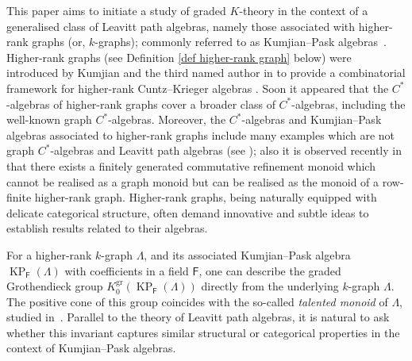 \documentclass[12pt]{amsart}
\newcommand{\KP}{\operatorname{KP}}
\theoremstyle{definition}
\theoremstyle{remark}
\newcommand{\gr}{\operatorname{gr}}
\begin{document}
This paper aims to initiate a study of graded $K$-theory in the context of a generalised class of Leavitt path algebras, namely those associated with higher-rank graphs (or, $k$-graphs); commonly referred to as Kumjian–Pask algebras~\cite{Pino}. Higher-rank graphs (see Definition \ref{def higher-rank graph} below) were introduced by Kumjian and the third named author in \cite{Kumjian--Pask} to provide a combinatorial framework for higher-rank Cuntz--Krieger algebras \cite{RS}. Soon it appeared that the $C^*$-algebras of higher-rank graphs cover a broader class of $C^*$-algebras, including the well-known graph $C^*$-algebras. Moreover, the $C^*$-algebras and Kumjian--Pask algebras associated to higher-rank graphs include many examples which are not graph $C^*$-algebras and Leavitt path algebras (see \cite{Pask, Pino}); also it is observed recently in \cite{HMPS} that there exists a finitely generated commutative refinement monoid which cannot be realised as a graph monoid but can be realised as the monoid of a row-finite higher-rank graph. Higher-rank graphs, being naturally equipped with delicate categorical structure, often demand innovative and subtle ideas to establish results related to their algebras. 

For a higher-rank $k$-graph $\Lambda$, and its associated Kumjian--Pask algebra $\KP_\mathsf{F}(\Lambda)$ with coefficients in a field $\mathsf{F}$, one can describe the graded Grothendieck group $K_0^{\gr}(\KP_\mathsf{F}(\Lambda))$ directly from the underlying $k$-graph $\Lambda$. The positive cone of this group coincides with the so-called \emph{talented monoid} of $\Lambda$, studied in~\cite{HMPS}. 
Parallel to the theory of Leavitt path algebras, it is natural to ask whether this invariant captures similar structural or categorical properties  in the context of Kumjian–Pask algebras. 
 
\end{document}
